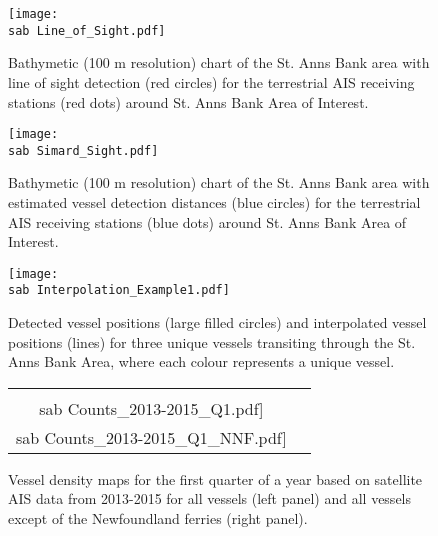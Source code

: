 \documentclass{beamer}
\numberwithin{equation}{section}		%
\numberwithin{figure}{section}		%
\numberwithin{table}{section}				%
\newcommand{\ecomod}{\string~/ecomod_data/}   %
\newcommand{\sab}{\ecomod/mpa/sab/}   %
\begin{document}

\begin{frame}[shrink]

\begin{figure}[h]
	\centering
	\texttt{[image: \\sab Line\_of\_Sight.pdf]}
	\caption{Bathymetic (100 m resolution) chart of the  St. Anns Bank area with line of sight detection (red circles) for the terrestrial AIS receiving stations (red dots) around St. Anns Bank Area of Interest.}
   \label{fig:LOF}
\end{figure}

\end{frame}




\begin{frame}[shrink]
\begin{figure}[h]
	\centering
	\texttt{[image: \\sab Simard\_Sight.pdf]}
	\caption{Bathymetic (100 m resolution) chart of the  St. Anns Bank area with estimated vessel detection distances (blue circles) for the terrestrial AIS receiving stations (blue dots) around St. Anns Bank Area of Interest.}
  \label{fig:DetAIS}
\end{figure}

\end{frame}



\begin{frame}[shrink]
  
\begin{figure}[h]
	\centering
	\texttt{[image: \\sab Interpolation\_Example1.pdf]}
	\caption{Detected vessel positions (large filled circles) and interpolated vessel positions (lines) for three unique vessels transiting through the St. Anns Bank Area, where each colour represents a unique vessel.}
	\label{fig:astar}
\end{figure}

\end{frame}

\begin{frame}[shrink]
\begin{figure}[h]

	\centering
	\begin{tabular}{cc}
		\texttt{[image: \\sab Counts\_2013-2015\_Q1.pdf]} &
		\texttt{[image: \\sab Counts\_2013-2015\_Q1\_NNF.pdf]}
	\end{tabular}
	\caption{Vessel density maps for the first quarter of a year based on satellite AIS data from 2013-2015 for all vessels (left panel) and all vessels except of the Newfoundland ferries (right panel).}
	\label{fig:countmaps}
\end{figure}
\end{frame}
\end{document}
